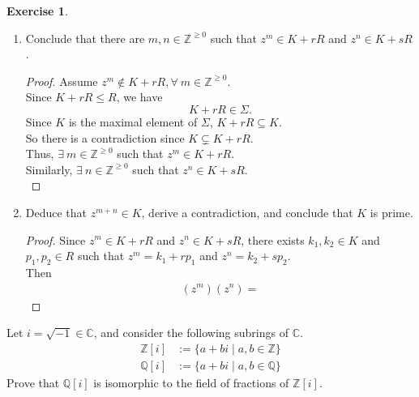 \documentclass{article}
\newcommand{\bbc}{\mathbb{C}}
\newcommand{\bbz}{\mathbb{Z}}
\newcommand{\bbq}{\mathbb{Q}}
\theoremstyle{plain}
\theoremstyle{definition}
\newtheorem{exer}[lem]{Exercise}
\begin{document}
\begin{exer}
\begin{enumerate}[(a)]
\begin{enumerate}[(1)]
\begin{proof}
    Since $1_R \in R$, 
    \[K+r=K+r1_R \subseteq K+rR = K.\]
    By part (a), we already have $K \leq R$, so $r \in K$.\\
    As a result, there is a contradiction since $r \in R-K$ by assumption.\\
    Therefore, 
    \begin{equation}\label{eq2.1}
        K \subsetneq K +rR.
    \end{equation}
    Since $R$ is CRW1, $rR = (r)R \leq R$.\\
   Also, $K \leq R$.\\
   So 
   \begin{equation}\label{eq2.2}
        K+rR \leq R.
    \end{equation}
    By \eqref{eq2.1} and \eqref{eq2.2}, 
   \[K \subsetneq K +rR \leq R.\]
   Similarly, 
   \[K \subsetneq K +sR \leq R.\]

\end{proof}
\item Conclude that there are $m,n\in\bbz^{\geq 0}$ such that $z^m\in K+rR$ and $z^n\in K+sR$.
\begin{proof}
    Assume $z^m \not\in K+rR, \forall \ m \in \bbz^{\geq 0}$.\\
    Since $K+rR \leq R$, we have 
    \[K+rR \in \Sigma.\]
    Since $K$ is the maximal element of $\Sigma$, $K+rR \subseteq K$.\\
    So there is a contradiction since $K \subsetneq K+rR$.\\
    Thus, $\exists \ m \in \bbz^{\geq 0}$ such that $z^m \in K+rR$.\\
    Similarly, $\exists \ n \in \bbz^{\geq 0}$ such that $z^n \in K+sR$.\\
\end{proof}
\item Deduce that $z^{m+n}\in K$,  derive a contradiction, and conclude that $K$ is prime.
    \begin{proof}
        Since $z^m \in K+rR$ and $z^n \in K+sR$, there exists $k_1,k_2 \in K$ and $p_1,p_2 \in R$ such that $z^m = k_1 + rp_1$ and $z^n = k_2+ sp_2$.\\
        Then 
        \begin{align*}
            (z^m) (z^n) = 
        \end{align*}
    \end{proof}
\end{enumerate}
\end{enumerate}

Let $i=\sqrt{-1}\in\bbc$, and consider the following subrings of $\bbc$.
\begin{align*}
\bbz[i]&:=\{a+bi\mid a,b\in\bbz\}
\\
\bbq[i]&:=\{a+bi\mid a,b\in\bbq\}
\end{align*}
Prove that $\bbq[i]$ is isomorphic to the field of fractions of $\bbz[i]$.
\end{exer}
\end{document}
